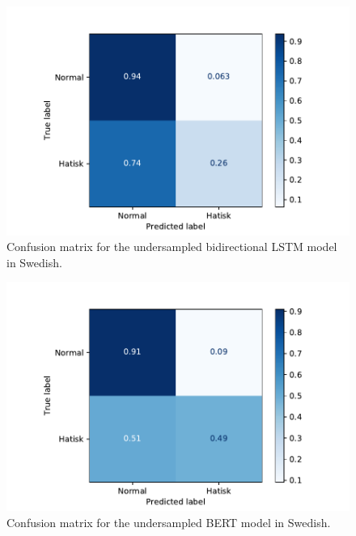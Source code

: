 \documentclass[nofilelist]{cslthse-msc}
\begin{document}
\begin{figure}[t]
    \centering
    \includegraphics[width=\textwidth*3/4]{bilstmcharIfragasattundersampled.pdf}
    \caption{Confusion matrix for the undersampled bidirectional LSTM model in Swedish.}
    \label{fig:underBiLSTM}
\end{figure}


\begin{figure}[t]
    \centering
    \includegraphics[width=\textwidth*3/4]{bertIfragasattresampled.pdf}
    \caption{Confusion matrix for the undersampled BERT model in Swedish.}
    \label{fig:underBERT}
\end{figure}

\end{document}
